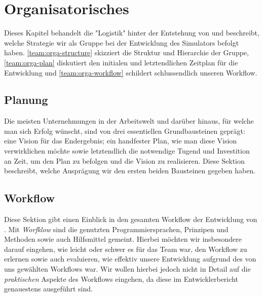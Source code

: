 
\section{Organisatorisches}
\label{team:orga}

Dieses Kapitel behandelt die "Logistik" hinter der Entstehung von \erasim{} und
beschreibt, welche Strategie wir als Gruppe bei der Entwicklung des Simulators
befolgt haben. \autoref{team:orga-structure} skizziert die Struktur und
Hierarchie der Gruppe, \autoref{team:orga-plan} diskutiert den initialen und
letztendlichen Zeitplan für die Entwicklung und
\autoref{team:orga-workflow} schildert schlussendlich unseren Workflow.



\subsection{Planung}
\label{team:orga-plan}

Die meisten Unternehmungen in der Arbeitswelt und darüber hinaus, für welche man
sich Erfolg wünscht, sind von drei essentiellen Grundbausteinen geprägt: eine
Vision für das Endergebnis; ein handfester Plan, wie man diese Vision
verwirklichen möchte sowie letztendlich die notwendige Tugend und Investition an
Zeit, um den Plan zu befolgen und die Vision zu realisieren. Diese Sektion
beschreibt, welche Ausprägung wir den ersten beiden Bausteinen gegeben haben.





\subsection{Workflow}
\label{team:orga-workflow}
\vspace{-0.2cm}

Diese Sektion gibt einen Einblick in den gesamten Workflow der Entwicklung von
\erasim{}. Mit \emph{Worfklow} sind die genutzten Programmiersprachen, Prinzipen
und Methoden sowie auch Hilfsmittel gemeint. Hierbei möchten wir insbesondere
darauf eingehen, wie leicht oder schwer es für das Team war, den Workflow zu
erlernen sowie auch evaluieren, wie effektiv unsere Entwicklung aufgrund des von
uns gewählten Workflows war. Wir wollen hierbei jedoch nicht in Detail auf die
\emph{praktischen} Aspekte des Workflows eingehen, da diese im Entwicklerbericht
genauestens ausgeführt sind.




